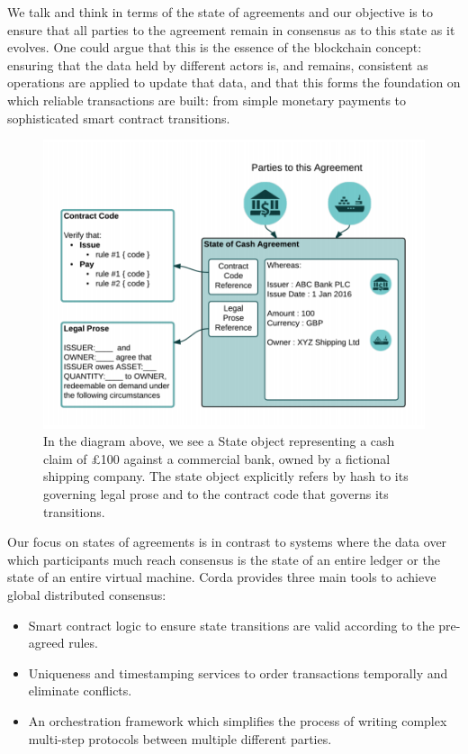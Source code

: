 \documentclass{article}
\begin{document}
We talk and think in terms of the state of agreements and our objective is to ensure that all parties to the agreement remain in consensus as to this state as it evolves. One could argue that this is the essence of the blockchain concept: ensuring that the data held by different actors is, and remains, consistent as operations are applied to update that data, and that this forms the foundation on which reliable transactions are built: from simple monetary payments to sophisticated smart contract transitions.

\begin{figure}[H]
\includegraphics[scale = .4, center]{partiesto}
\caption{In the diagram above, we see a State object representing a cash claim of \pounds100 against a commercial bank, owned by a fictional shipping company.  The state object explicitly refers by hash to its governing legal prose and to the contract code that governs its transitions.}
\end{figure}

Our focus on states of agreements is in contrast to systems where the data over which participants much reach consensus is the state of an entire ledger or the state of an entire virtual machine. Corda provides three main tools to achieve global distributed consensus:
\begin{itemize}
    \item Smart contract logic to ensure state transitions are valid according to the pre-agreed rules.
    \item Uniqueness and timestamping services to order transactions temporally and eliminate conflicts.
    \item An orchestration framework which simplifies the process of writing complex multi-step protocols between multiple different parties.
    \end{itemize}
    
\end{document}
